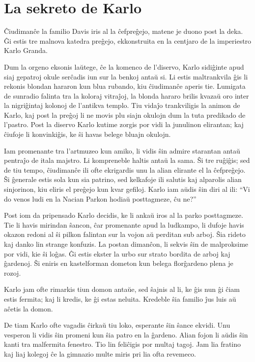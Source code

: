 \chapter{La sekreto de Karlo}

Ĉiudimanĉe la familio Davis iris al la ĉefpreĝejo, matene je duono post la deka. Ĝi estis tre malnova katedra preĝejo, ekkonstruita en la centjaro de la imperiestro Karlo Granda.

Dum la orgeno eksonis laŭtege, ĉe la komenco de l'diservo, Karlo sidiĝinte apud siaj gepatroj okule serĉadis iun sur la benkoj antaŭ si. Li estis maltrankvila ĝis li rekonis blondan hararon kun blua rubando, kiu ĉiudimanĉe aperis tie. Lumigata de sunradio falinta tra la koloraj vitraĵoj, la blonda hararo brilis kvazaŭ oro inter la nigriĝintaj kolonoj de l'antikva templo. Tiu vidaĵo trankviligis la animon de Karlo, kaj post la preĝoj li ne movis plu siajn okulojn dum la tuta predikado de l'pastro. Post la diservo Karlo kutime zorgis por vidi la junulinon elirantan; kaj ĉiufoje li konvinkiĝis, ke ŝi havas belege bluajn okulojn.

Iam promenante tra l'artmuzeo kun amiko, li vidis ŝin admire starantan antaŭ pentraĵo de itala majstro. Li kompreneble haltis antaŭ la sama. Ŝi tre ruĝiĝis; sed de tiu tempo, ĉiudimanĉe ili ofte ekrigardis unu la alian elirante el la ĉefpreĝejo. Ŝi ĝenerale estis sola kun sia patrino, sed kelkafoje ili salutis kaj alparolis alian sinjorinon, kiu eliris el preĝejo kun kvar gefiloj. Karlo iam aŭdis ŝin diri al ili: ``Vi do venos ludi en la Nacian Parkon hodiaŭ posttagmeze, ĉu ne?''

Post iom da pripensado Karlo decidis, ke li ankaŭ iros al la parko posttagmeze. Tie li havis mirindan ŝancon, ĉar promenante apud la ludkampo, li dufoje havis okazon redoni al ŝi pilkon falintan sur la vojon aŭ perditan sub arboj. Ŝia rideto kaj danko lin strange konfuzis. La postan dimanĉon, li sekvis ŝin de malproksime por vidi, kie ŝi loĝas. Ĝi estis ekster la urbo sur strato bordita de arboj kaj ĝardenoj. Ŝi eniris en kastelforman dometon kun belega florĝardeno plena je rozoj.

Karlo jam ofte rimarkis tiun domon antaŭe, sed ŝajnis al li, ke ĝis nun ĝi ĉiam estis fermita; kaj li kredis, ke ĝi estas neluita. Kredeble ŝia familio ĵus luis aŭ aĉetis la domon.

De tiam Karlo ofte vagadis ĉirkaŭ tiu loko, esperante ŝin ŝance ekvidi. Unu vesperon li vidis ŝin promeni kun ŝia patro en la ĝardeno. Alian fojon li aŭdis ŝin kanti tra malfermita fenestro. Tio lin feliĉigis por multaj tagoj. Jam lia fratino kaj liaj kolegoj ĉe la gimnazio multe miris pri lia ofta revemeco.

